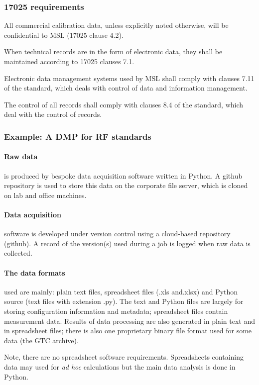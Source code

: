 \subsubsection{17025 requirements}

All commercial calibration data, unless explicitly noted otherwise, will be confidential to MSL (17025 clause 4.2).

When technical records are in the form of electronic data, they shall be maintained according to 17025 clauses 7.1.

Electronic data management systems used by MSL shall comply with clauses 7.11 of the standard, which deals with control of data and information management.

The control of all records shall comply with clauses 8.4 of the standard, which deal with the control of records.

\subsubsection{Example: A DMP for RF standards}
\paragraph{Raw data} is produced by bespoke data acquisition software written in Python. A github repository is used to store this data on the corporate file server, which is cloned on lab and office machines. 

\paragraph{Data acquisition} software is developed under version control using a cloud-based repository (github). A record of the version(s) used during a job is logged when raw data is collected.  

\paragraph{The data formats} used are mainly: plain text files, spreadsheet files (.xls and.xlsx) and Python source (text files with extension .py). The text and Python files are largely for storing configuration information and metadata; spreadsheet files contain measurement data. Results of data processing are also generated in plain text and in spreadsheet files; there is also one proprietary binary file format used for some data (the GTC archive). 

Note, there are no spreadsheet software requirements. Spreadsheets containing data may used for \textit{ad hoc} calculations but the main data analysis is done in Python. 

